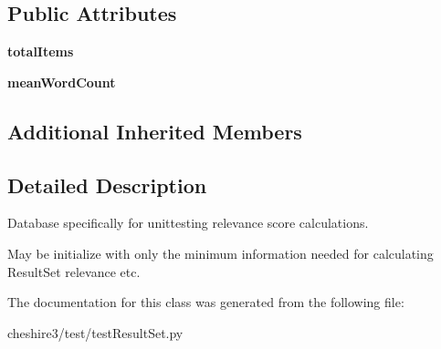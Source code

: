 \subsection*{Public Attributes}
\begin{DoxyCompactItemize}
\item 
\hypertarget{classcheshire3_1_1test_1_1test_result_set_1_1_fake_database_a26697cc15fb19510f23404d169d9257b}{{\bfseries total\-Items}}\label{classcheshire3_1_1test_1_1test_result_set_1_1_fake_database_a26697cc15fb19510f23404d169d9257b}

\item 
\hypertarget{classcheshire3_1_1test_1_1test_result_set_1_1_fake_database_a070b8e12f3abfba7c4cd67e3bf6a1777}{{\bfseries mean\-Word\-Count}}\label{classcheshire3_1_1test_1_1test_result_set_1_1_fake_database_a070b8e12f3abfba7c4cd67e3bf6a1777}

\end{DoxyCompactItemize}
\subsection*{Additional Inherited Members}


\subsection{Detailed Description}
\begin{DoxyVerb}Database specifically for unittesting relevance score calculations.

May be initialize with only the minimum information needed for calculating
ResultSet relevance etc.
\end{DoxyVerb}
 

The documentation for this class was generated from the following file\-:\begin{DoxyCompactItemize}
\item 
cheshire3/test/test\-Result\-Set.\-py\end{DoxyCompactItemize}
